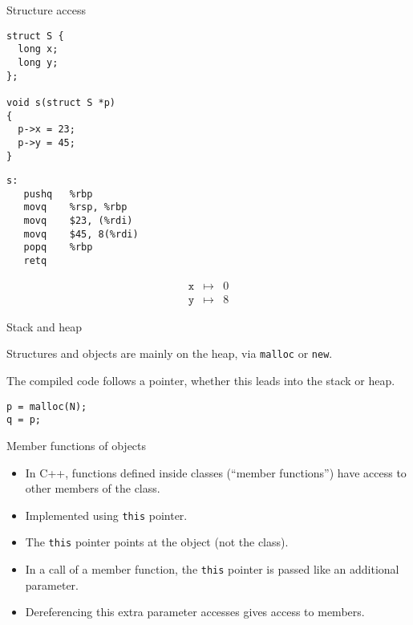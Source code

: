 \documentclass[landscape]{beamer}
\begin{document}
\begin{frame}[fragile]{Structure access}
\begin{minipage}{.5\textwidth}
\begin{verbatim}
struct S {
  long x;
  long y;
};

void s(struct S *p)
{
  p->x = 23;
  p->y = 45;
}
\end{verbatim}
\end{minipage}
%
\begin{minipage}{.45\textwidth}
\begin{verbatim}
s:      
   pushq   %rbp
   movq    %rsp, %rbp
   movq    $23, (%rdi)
   movq    $45, 8(%rdi)
   popq    %rbp
   retq
\end{verbatim}
\end{minipage}
\begin{eqnarray*}
\texttt x&\mapsto& 0
\\
\texttt y&\mapsto& 8
\end{eqnarray*}
\end{frame}


\begin{frame}[fragile]{Stack and heap}

Structures and objects are mainly on the heap, via \texttt{malloc} or \texttt{new}.

The compiled code follows a pointer, whether this leads into the stack or heap.
\begin{verbatim}
p = malloc(N);
q = p;
\end{verbatim}

\end{frame}


\begin{frame}{Member functions of objects}

\begin{itemize}
\item
In C++, functions defined inside classes (``member functions'') have access to other members of the class.
\item
Implemented using \texttt{this} pointer.
\item
The \texttt{this} pointer points at the object (not the class).
\item
In a call of a member function, the \texttt{this} pointer is passed like an additional parameter.
\item
Dereferencing this extra parameter accesses gives access to members.
\end{itemize}

\end{frame}
\end{document}
